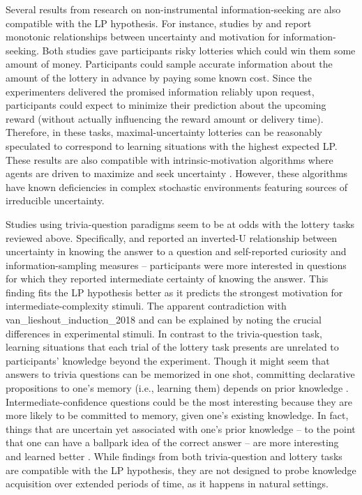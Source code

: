Several results from research on non-instrumental information-seeking are also compatible with the \ac{LP} hypothesis. For instance, studies by \citeyearpar{van_lieshout_induction_2018} and \citeauthor{kobayashi_diverse_2019} \citeyearpar{kobayashi_diverse_2019} report monotonic relationships between uncertainty and motivation for information-seeking. Both studies gave participants risky lotteries which could win them some amount of money. Participants could sample accurate information about the amount of the lottery in advance by paying some known cost. Since the experimenters delivered the promised information reliably upon request, participants could expect to minimize their prediction about the upcoming reward (without actually influencing the reward amount or delivery time). Therefore, in these tasks, maximal-uncertainty lotteries can be reasonably speculated to correspond to learning situations with the highest expected \ac{LP}. These results are also compatible with intrinsic-motivation algorithms where agents are driven to maximize and seek uncertainty \parencite[see ][]{oudeyer_intrinsic_2007,linke_adapting_2020}. However, these algorithms have known deficiencies in complex stochastic environments featuring sources of irreducible uncertainty. 

Studies using trivia-question paradigms seem to be at odds with the lottery tasks reviewed above. Specifically, \citeauthor{kang_wick_2009} \citeyearpar{kang_wick_2009} and \citeauthor{baranes_eye_2015} \citeyearpar{baranes_eye_2015} reported an inverted-U relationship between uncertainty in knowing the answer to a question and self-reported curiosity and information-sampling measures -- participants were more interested in questions for which they reported intermediate certainty of knowing the answer. This finding fits the \ac{LP} hypothesis better as it predicts the strongest motivation for intermediate-complexity stimuli. The apparent contradiction with \citeauthor{}{van_lieshout_induction_2018} \citeyearpar{van_lieshout_induction_2018} and \citeauthor{kobayashi_diverse_2019} \citeyearpar{kobayashi_diverse_2019} can be explained by noting the crucial differences in experimental stimuli. In contrast to the trivia-question task, learning situations that each trial of the lottery task presents are unrelated to participants' knowledge beyond the experiment. Though it might seem that answers to trivia questions can be memorized in one shot, committing declarative propositions to one's memory (i.e., learning them) depends on prior knowledge \parencite{brod_influence_2013}. Intermediate-confidence questions could be the most interesting because they are more likely to be committed to memory, given one's existing knowledge. In fact, things that are uncertain yet associated with one's prior knowledge -- to the point that one can have a ballpark idea of the correct answer -- are more interesting and learned better \parencite{brod_lighting_2019}. While findings from both trivia-question and lottery tasks are compatible with the \ac{LP} hypothesis, they are not designed to probe knowledge acquisition over extended periods of time, as it happens in natural settings.

